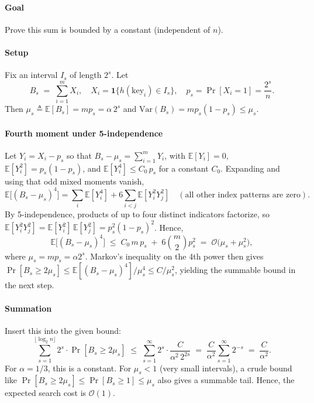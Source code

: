 \paragraph{Goal} Prove this sum is bounded by a constant (independent of \(n\)).

\paragraph{Setup} Fix an interval \(I_s\) of length \(2^s\). Let
\[
  B_s \;=\; \sum_{i=1}^m X_i,\quad X_i=\mathbf{1}\{h(\text{key}_i)\in I_s\},\quad
  p_s=\Pr[X_i=1]=\frac{2^s}{n}.
\]
Then \(\mu_s \triangleq \mathbb{E}[B_s]=m p_s=\alpha\, 2^s\) and \(\mathrm{Var}(B_s)=m p_s(1-p_s)\le \mu_s\).

\paragraph{Fourth moment under 5-independence}
Let \(Y_i=X_i-p_s\) so that \(B_s-\mu_s=\sum_{i=1}^m Y_i\), with \(\mathbb{E}[Y_i]=0\),
\(\mathbb{E}[Y_i^2]=p_s(1-p_s)\), and \(\mathbb{E}[Y_i^4]\le C_0\,p_s\) for a constant \(C_0\).
Expanding and using that odd mixed moments vanish,
\[
  \mathbb{E}\big[(B_s-\mu_s)^4\big]
  = \sum_i \mathbb{E}[Y_i^4] + 6\!\!\sum_{i<j}\! \mathbb{E}[Y_i^2 Y_j^2]
  \quad (\text{all other index patterns are zero}).
\]
By 5-independence, products of up to four distinct indicators factorize, so
\(\mathbb{E}[Y_i^2 Y_j^2]=\mathbb{E}[Y_i^2]\,\mathbb{E}[Y_j^2]=p_s^2(1-p_s)^2\).
Hence,
\[
  \mathbb{E}\big[(B_s-\mu_s)^4\big]
  \;\le\; C_0\,m\,p_s \;+\; 6\binom{m}{2}\!p_s^2
  \;=\; \mathcal{O}\!\big(\mu_s + \mu_s^2\big),
\]
where \(\mu_s=m p_s=\alpha 2^s\). Markov’s inequality on the 4th power then gives
\(\Pr[B_s\!\ge 2\mu_s]\le \mathbb{E}[(B_s-\mu_s)^4]/\mu_s^4 \le C/\mu_s^2\),
yielding the summable bound in the next step.

\paragraph{Summation}
Insert this into the given bound:
\[
  \sum_{s=1}^{\lfloor\log_2 n\rfloor} 2^s \cdot \Pr[B_s \ge 2\mu_s]
  \;\le\; \sum_{s=1}^{\infty} 2^s \cdot \frac{C}{\alpha^2\,2^{2s}}
  \;=\; \frac{C}{\alpha^2}\sum_{s=1}^{\infty} 2^{-s}
  \;=\; \frac{C}{\alpha^2}.
\]
For \(\alpha=1/3\), this is a constant. For \(\mu_s<1\) (very small intervals), a crude bound like
\(\Pr[B_s\ge 2\mu_s]\le \Pr[B_s\ge 1]\le \mu_s\) also gives a summable tail. Hence, the expected search cost is \( \mathcal{O}(1)\).
